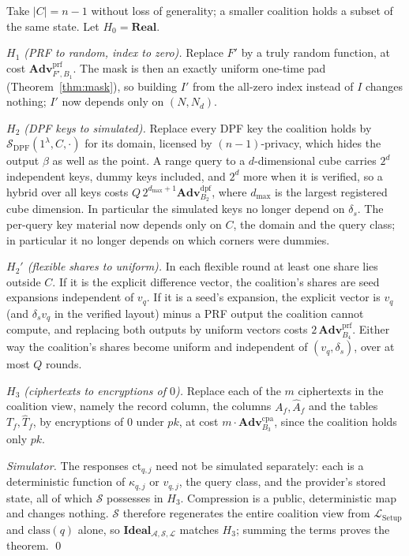\documentclass[a4paper,fleqn]{cas-sc}
\newcommand{\Real}{\mathbf{Real}}
\newcommand{\Ideal}{\mathbf{Ideal}}
\newcommand{\Leak}{\mathcal{L}}
\newcommand{\Sim}{\mathcal{S}}
\newcommand{\Adv}{\mathcal{A}}
\newcommand{\advPRF}{\mathbf{Adv}^{\mathrm{prf}}}
\newcommand{\advDPF}{\mathbf{Adv}^{\mathrm{dpf}}}
\newcommand{\advCPA}{\mathbf{Adv}^{\mathrm{cpa}}}
\begin{document}
\begin{pf}
Take $|C|=n-1$ without loss of generality; a smaller coalition holds a subset
of the same state. Let $H_0=\Real$.

\emph{$H_1$ (PRF to random, index to zero).} Replace $F'$ by a truly random
function, at cost $\advPRF_{F',B_1}$. The mask is then an
exactly uniform one-time pad (Theorem~\ref{thm:mask}), so building $I'$ from
the all-zero index instead of $I$ changes nothing; $I'$ now depends only on
$(N,N_d)$.

\emph{$H_2$ (DPF keys to simulated).} Replace every DPF key the coalition
holds by $\Sim_{\mathrm{DPF}}(1^\lambda,C,\cdot)$ for its domain, licensed by
$(n{-}1)$-privacy, which hides the output $\beta$ as well as the point. A range
query to a $d$-dimensional cube carries $2^d$ independent keys, dummy keys
included, and $2^d$ more when it is verified, so a hybrid over all keys costs
$Q\,2^{d_{\max}+1}\advDPF_{B_2}$, where $d_{\max}$ is the
largest registered cube dimension. In particular the simulated keys no longer
depend on $\delta_s$. The per-query key material now depends only
on $C$, the domain and the query class; in particular it no longer depends on
which corners were dummies.

\emph{$H_2'$ (flexible shares to uniform).} In each flexible round at least one
share lies outside $C$. If it is the explicit difference vector, the
coalition's shares are seed expansions independent of $v_q$. If it is a seed's
expansion, the explicit vector is $v_q$ (and $\delta_s v_q$ in the verified
layout) minus a PRF output the coalition cannot
compute, and replacing both outputs by uniform vectors costs
$2\,\advPRF_{B_4}$. Either way the coalition's shares become
uniform and independent of $(v_q,\delta_s)$, over at most $Q$ rounds.

\emph{$H_3$ (ciphertexts to encryptions of $0$).} Replace each of the $m$
ciphertexts in the coalition view, namely the record column, the columns
$A_f,\widehat A_f$ and the tables $T_f,\widehat T_f$, by encryptions of $0$
under $pk$,
at cost $m\cdot\advCPA_{B_3}$, since the coalition holds
only $pk$.

\emph{Simulator.} The responses $\text{ct}_{q,j}$ need not be simulated
separately: each is a deterministic function of $\kappa_{q,j}$ or $v_{q,j}$,
the query class, and the provider's stored state, all of which $\Sim$
possesses in $H_3$. Compression is a public, deterministic map and changes
nothing. $\Sim$ therefore regenerates the entire coalition view from
$\Leak_{\mathrm{Setup}}$ and $\mathrm{class}(q)$ alone, so
$\Ideal_{\Adv,\Sim,\Leak}$ matches $H_3$; summing the terms proves the
theorem. \qed
\end{pf}
\end{document}

